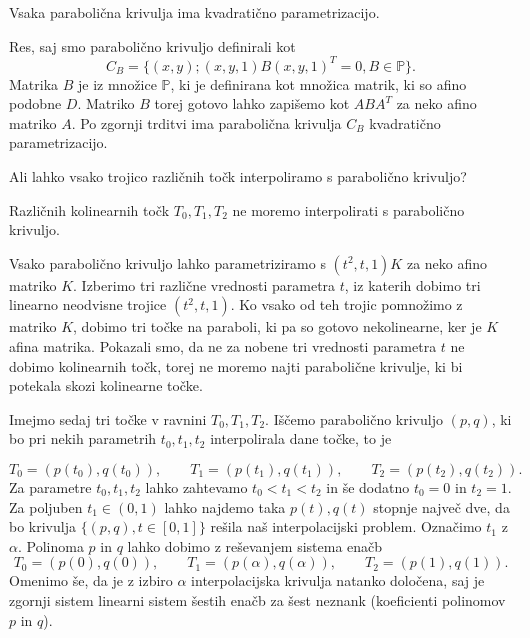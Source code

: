 \documentclass[mat1]{fmfdelo}
\newcommand{\PP}{\mathbb P}
\newcommand{\al}{\alpha}
\begin{document}
\begin{posledica}
Vsaka parabolična krivulja ima kvadratično parametrizacijo.
\end{posledica}

\begin{dokaz}
Res, saj smo parabolično krivuljo definirali kot
$$ C_B = \{ (x,y); (x,y,1) B (x, y, 1)^T = 0, B \in \PP \}.$$
Matrika $B$ je iz množice $\PP$, ki je definirana kot množica matrik, ki so afino podobne $D$. Matriko $B$ torej gotovo lahko zapišemo kot $ABA^T$ za neko afino matriko $A$. Po zgornji trditvi ima parabolična krivulja $C_B$ kvadratično parametrizacijo.
\end{dokaz}

Ali lahko vsako trojico različnih točk interpoliramo s parabolično krivuljo? 

\begin{trditev}
Različnih kolinearnih točk $T_0, T_1, T_2$ ne moremo interpolirati s parabolično krivuljo.
\end{trditev}





\begin{dokaz}
Vsako parabolično krivuljo lahko parametriziramo s $(t^2, t,1)K$ za neko afino matriko $K$. Izberimo tri različne vrednosti parametra $t$, iz katerih dobimo tri linearno neodvisne trojice $(t^2, t, 1)$. Ko vsako od teh trojic pomnožimo z matriko $K$, dobimo tri točke na paraboli, ki pa so gotovo nekolinearne, ker je $K$ afina matrika. Pokazali smo, da ne za nobene tri vrednosti parametra $t$ ne dobimo kolinearnih točk, torej ne moremo najti parabolične krivulje, ki bi potekala skozi kolinearne točke.
\end{dokaz}

Imejmo sedaj tri točke v ravnini $T_0, T_1, T_2$. Iščemo parabolično krivuljo $(p, q)$, ki bo pri nekih parametrih $t_0, t_1, t_2$ interpolirala dane točke, to je %

$$ T_0 = (p(t_0), q(t_0)), \qquad T_1 = (p(t_1), q(t_1)), \qquad T_2 = (p(t_2), q(t_2)).$$
Za parametre $t_0, t_1, t_2$ lahko zahtevamo $t_0 < t_1 < t_2$ in še dodatno $t_0 = 0$ in $t_2 = 1$. Za poljuben $t_1 \in (0,1)$  lahko najdemo taka $p(t), q(t)$ stopnje največ dve, da bo krivulja $ \{(p, q), t \in [0,1] \}$ rešila naš interpolacijski problem. Označimo $t_1$ z $\al.$  Polinoma $p$ in $q$  lahko dobimo z reševanjem sistema enačb
\begin{equation}\label{sistem}
T_0 = (p(0), q(0)), \qquad T_1 = (p(\al), q(\al)), \qquad T_2 = (p(1), q(1)).
\end{equation}
Omenimo še, da je z izbiro $\al$ interpolacijska krivulja natanko določena, saj je zgornji sistem linearni sistem šestih enačb za šest neznank (koeficienti polinomov $p$ in $q$).
\end{document}
